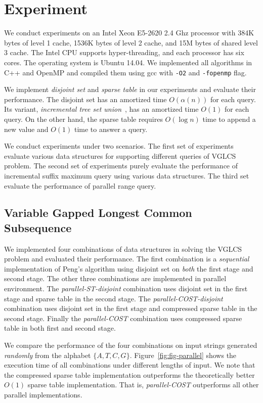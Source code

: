 \section{Experiment} \label{sec:Experiment}

We conduct experiments on an Intel Xeon E5-2620 2.4 Ghz processor with
384K bytes of level 1 cache, 1536K bytes of level 2 cache, and 15M
bytes of shared level 3 cache.  The Intel CPU supports
hyper-threading, and each processor has six cores.  The operating
system is Ubuntu 14.04.  We implemented all algorithms in C++ and
OpenMP and compiled them using gcc with {\tt -O2} and {\tt -fopenmp}
flag.

We implement {\em disjoint set} and {\em sparse table} in our
experiments and evaluate their performance.  The disjoint set has an
amortized time $O(\alpha(n))$ for each query.  Its variant, {\em
  incremental tree set union}~\cite{Gabow1983ALA}, has an amortized
time $O(1)$ for each query.  On the other hand, the sparse table
requires $O(\log n)$ time to append a new value and $O(1)$ time to
answer a query.

We conduct experiments under two scenarios.  The first set of
experiments evaluate various data structures for supporting different
queries of VGLCS problem.  The second set of experiments purely
evaluate the performance of incremental suffix maximum query using
various data structures.  The third set evaluate the performance of
parallel range query.

\subsection{Variable Gapped Longest Common Subsequence}

We implemented four combinations of data structures in solving the
VGLCS problem and evaluated their performance.  The first combination
is a {\em sequential} implementation of Peng's algorithm using
disjoint set on {\em both} the first stage and second stage.  The
other three combinations are implemented in parallel environment.  The
{\em parallel-ST-disjoint} combination uses disjoint set in the first
stage and sparse table in the second stage.  The {\em
  parallel-COST-disjoint} combination uses disjoint set in the first
stage and compressed sparse table in the second stage.  Finally the
{\em parallel-COST} combination uses compressed sparse table in both
first and second stage.

We compare the performance of the four combinations on input strings
generated {\em randomly} from the alphabet $\{A, T, C, G\}$.
Figure~\ref{fig:fig-parallel} shows the execution time of all
combinations under different lengths of input.  We note that the
compressed sparse table implementation outperforms the theoretically
better $O(1)$ sparse table implementation.  That is, {\em
  parallel-COST} outperforms all other parallel implementations.
  
